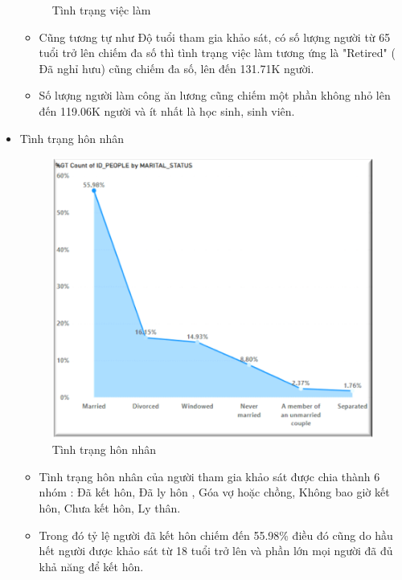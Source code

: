 \begin{itemize}[label=$-$]
\begin{center}
\begin{figure}[!h]
              \caption{Tình trạng việc làm }
            \end{figure}
\end{center}
\begin{itemize}[label=$+$]
\item Cũng tương tự như Độ tuổi tham gia khảo sát, có số lượng người từ 65 tuổi trở lên chiếm đa số thì tình trạng việc làm tương ứng là "Retired" ( Đã nghỉ hưu) cũng chiếm đa số, lên đến 131.71K người.
\item Số lượng người làm công ăn lương cũng chiếm một phần không nhỏ lên đến 119.06K người và ít nhất là học sinh, sinh viên.
\end{itemize}
\newpage
\item Tình trạng hôn nhân
\begin{center}
            \begin{figure}[!h]
                \centering
                \includegraphics[scale = 0.7]{figures/Hoa/DE1.4.png} 
              \caption{Tình trạng hôn nhân }
            \end{figure}
\end{center}
\begin{itemize}[label=$+$]
\item Tình trạng hôn nhân của người tham gia khảo sát được chia thành 6 nhóm : Đã kết hôn, Đã ly hôn , Góa vợ hoặc chồng, Không bao giờ kết hôn, Chưa kết hôn, Ly thân.
\item Trong đó tỷ lệ người đã kết hôn chiếm đến 55.98\% điều đó cũng do hầu hết người được khảo sát từ 18 tuổi trở lên và phần lớn mọi người đã đủ khả năng để kết hôn.

\end{itemize}
\end{itemize}
